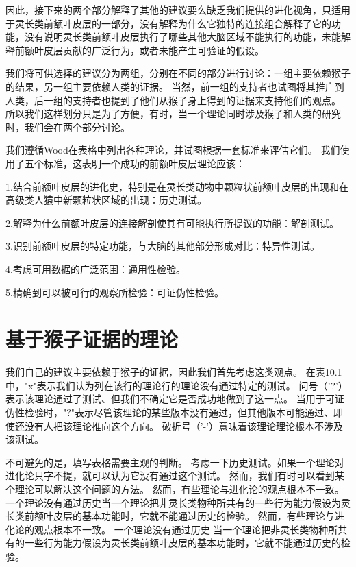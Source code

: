 因此，接下来的两个部分解释了其他的建议要么缺乏我们提供的进化视角，只适用于灵长类前额叶皮层的一部分，没有解释为什么它独特的连接组合解释了它的功能，没有说明灵长类前额叶皮层执行了哪些其他大脑区域不能执行的功能，未能解释前额叶皮层贡献的广泛行为，或者未能产生可验证的假设。
\par 
我们将可供选择的建议分为两组，分别在不同的部分进行讨论：一组主要依赖猴子的结果，另一组主要依赖人类的证据。
当然，前一组的支持者也试图将其推广到人类，后一组的支持者也提到了他们从猴子身上得到的证据来支持他们的观点。
所以我们这样划分只是为了方便，有时，当一个理论同时涉及猴子和人类的研究时，我们会在两个部分讨论。
\par 
我们遵循Wood在表格中列出各种理论，并试图根据一套标准来评估它们\cite{wood2003human}。
我们使用了五个标准，这表明一个成功的前额叶皮层理论应该：
\par 
1.结合前额叶皮层的进化史，特别是在灵长类动物中颗粒状前额叶皮层的出现和在高级类人猿中新颗粒状区域的出现：历史测试。
\par 
2.解释为什么前额叶皮层的连接解剖使其有可能执行所提议的功能：解剖测试。
\par 
3.识别前额叶皮层的特定功能，与大脑的其他部分形成对比：特异性测试。
\par 
4.考虑可用数据的广泛范围：通用性检验。
\par 
5.精确到可以被可行的观察所检验：可证伪性检验。


\section{基于猴子证据的理论}
我们自己的建议主要依赖于猴子的证据，因此我们首先考虑这类观点。
在表10.1中，"x"表示我们认为列在该行的理论行的理论没有通过特定的测试。
问号（'?'）表示该理论通过了测试、但我们不确定它是否成功地做到了这一点。
当用于可证伪性检验时，"?"表示尽管该理论的某些版本没有通过，但其他版本可能通过、即使还没有人把该理论推向这个方向。
破折号（'-'）意味着该理论理论根本不涉及该测试。
\par


不可避免的是，填写表格需要主观的判断。
考虑一下历史测试。如果一个理论对进化论只字不提，就可以认为它没有通过这个测试。
然而，我们有时可以看到某个理论可以解决这个问题的方法。 
然而，有些理论与进化论的观点根本不一致。
一个理论没有通过历史当一个理论把非灵长类物种所共有的一些行为能力假设为灵长类前额叶皮层的基本功能时，它就不能通过历史的检验。
然而，有些理论与进化论的观点根本不一致。
一个理论没有通过历史 当一个理论把非灵长类物种所共有的一些行为能力假设为灵长类前额叶皮层的基本功能时，它就不能通过历史的检验。
\par



